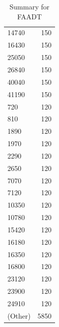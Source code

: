 \begin{table}[ht]
\begin{tabular}{lr}
  14740 & 150 \\ 
  16430 & 150 \\ 
  25050 & 150 \\ 
  26840 & 150 \\ 
  40040 & 150 \\ 
  41190 & 150 \\ 
  720 & 120 \\ 
  810 & 120 \\ 
  1890 & 120 \\ 
  1970 & 120 \\ 
  2290 & 120 \\ 
  2650 & 120 \\ 
  7070 & 120 \\ 
  7120 & 120 \\ 
  10350 & 120 \\ 
  10780 & 120 \\ 
  15420 & 120 \\ 
  16180 & 120 \\ 
  16350 & 120 \\ 
  16800 & 120 \\ 
  23120 & 120 \\ 
  23900 & 120 \\ 
  24910 & 120 \\ 
  (Other) & 5850 \\ 
   \hline
\end{tabular}
\caption{Summary for FAADT} 
\label{tab: FAADT}
\end{table}
